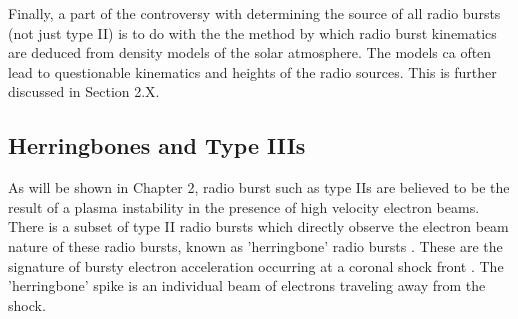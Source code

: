 Finally, a part of the controversy with determining the source of all radio bursts (not just type II) is to do with the the method by which radio burst kinematics are deduced from density models of the solar atmosphere. The models ca often lead to questionable kinematics and heights of the radio sources. This is further discussed in Section 2.X.


\subsection{Herringbones and Type IIIs}

As will be shown in Chapter 2, radio burst such as type IIs are believed to be the result of a plasma instability in the presence of high velocity electron beams. There is a subset of type II radio bursts which directly observe the electron beam nature of these radio bursts, known as 'herringbone' radio bursts \citep{cairns1987, cane1998}. These are the signature of bursty electron acceleration occurring at a coronal shock front \citep{mann2005}. The 'herringbone' spike is an individual beam of electrons traveling away from the shock. 


